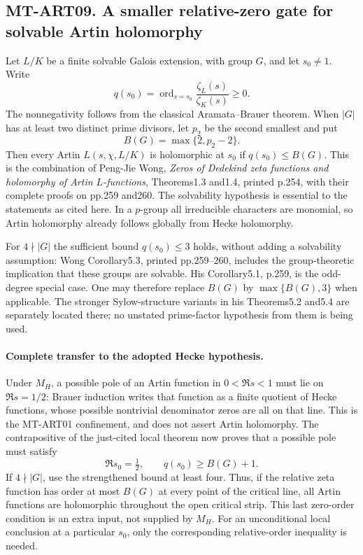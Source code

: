 \documentclass[11pt,a4paper]{article}
\begin{document}
\subsection*{MT-ART09. A smaller relative-zero gate for solvable Artin holomorphy}

Let $L/K$ be a finite solvable Galois extension, with group $G$,
and let $s_0\ne1$. Write
\[
 q(s_0)=\operatorname{ord}_{s=s_0}
             \frac{\zeta_L(s)}{\zeta_K(s)}\ge0.
\]
The nonnegativity follows from the classical Aramata--Brauer
theorem. When $|G|$ has at least two distinct prime divisors,
let $p_2$ be the second smallest and put
\[
                 B(G)=\max\{2,p_2-2\}.
\]
Then every Artin $L(s,\chi,L/K)$ is holomorphic at $s_0$ if
$q(s_0)\le B(G)$. This is the combination of Peng-Jie Wong,
\emph{Zeros of Dedekind zeta functions and holomorphy of Artin
$L$-functions}, Theorems1.3 and1.4, printed p.254, with their
complete proofs on pp.259 and260. The solvability hypothesis
is essential to the statements as cited here. In a $p$-group
all irreducible characters are monomial, so Artin holomorphy
already follows globally from Hecke holomorphy.

For $4\nmid |G|$ the sufficient bound $q(s_0)\le3$ holds,
without adding a solvability assumption: Wong Corollary5.3,
printed pp.259--260, includes the group-theoretic implication
that these groups are solvable. His Corollary5.1, p.259, is the
odd-degree special case. One may therefore replace $B(G)$ by
$\max\{B(G),3\}$ when applicable. The stronger Sylow-structure
variants in his Theorems5.2 and5.4 are separately located there;
no unstated prime-factor hypothesis from them is being used.

\paragraph{Complete transfer to the adopted Hecke hypothesis.}
Under $M_H$, a possible pole of an Artin function in
$0<\Re s<1$ must lie on $\Re s=1/2$: Brauer induction writes
that function as a finite quotient of Hecke functions, whose
possible nontrivial denominator zeros are all on that line.
This is the MT-ART01 confinement, and does not assert Artin
holomorphy. The contrapositive of the just-cited local theorem
now proves that a possible pole must satisfy
\[
 \Re s_0=\tfrac12,\qquad q(s_0)\ge B(G)+1.
 \tag{MT-ART09a}
\]
If $4\nmid |G|$, use the strengthened bound at least four.
Thus, if the relative zeta function has order at most $B(G)$
at every point of the critical line, all Artin functions are
holomorphic throughout the open critical strip. This last
zero-order condition is an extra input, not supplied by $M_H$.
For an unconditional local conclusion at a particular $s_0$,
only the corresponding relative-order inequality is needed.
\end{document}
